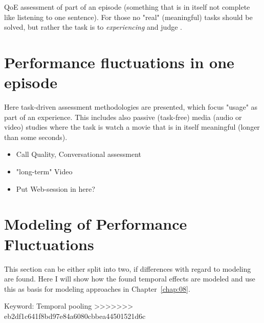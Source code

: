 QoE assessment of part of an episode (something that is in itself not complete like listening to one sentence).
For those no "real" (meaningful) tasks should be solved, but rather the task is to \textit{experiencing} and judge \cite{egger_qoe_2014}.

\section{Performance fluctuations in one episode}
Here task-driven assessment methodologies are presented, which focus "usage" as part of an experience.
This includes also passive (task-free) media (audio or video) studies where the task is watch a movie that is in itself meaningful (longer than some seconds).

\begin{itemize}
\item Call Quality, Conversational assessment
\item "long-term" Video
\item Put Web-session in here?
\end{itemize}


\section{Modeling of Performance Fluctuations}
This section can be either split into two, if differences with regard to modeling are found.
Here I will show how the found temporal effects are modeled and use this as basis for modeling approaches in Chapter~\ref{chap:08}.

Keyword: Temporal pooling
>>>>>>> eb2df1c641f8bd97e84a6080cbbea44501521d6c
